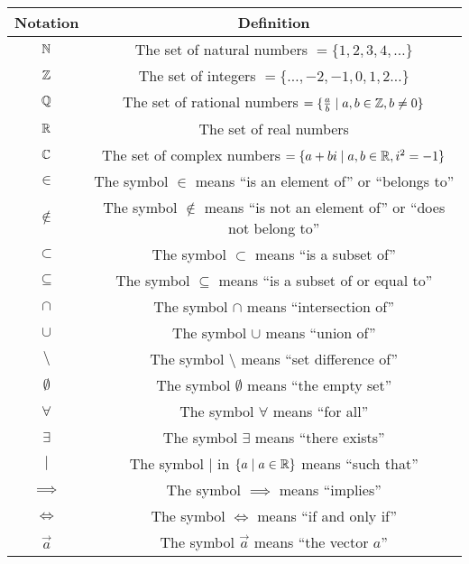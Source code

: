 \documentclass{report}
\begin{document}
\begin{table}[htpb]
	\centering
	\label{tab:notation}
	\begin{tabular}{|c|c|}
		\hline
		\textbf{Notation} & \textbf{Definition}                                                          \\
		\hline
		$\NN$             & The set of natural numbers $= \{1, 2, 3, 4, \ldots\}$                        \\
		$\ZZ$             & The set of integers $= \{\ldots, -2, -1, 0, 1, 2 \ldots\}$                   \\
		$\QQ$             & The set of rational numbers $= \{\frac{a}{b} \mid a, b \in \ZZ, b \neq 0 \}$ \\
		$\RR$             & The set of real numbers                                                      \\
		$\CC$             & The set of complex numbers $= \{a + bi \mid a, b \in \RR, i^2 = -1\}$        \\
		$\in$             & The symbol $\in$ means ``is an element of'' or ``belongs to''                \\
		$\notin$          & The symbol $\notin$ means ``is not an element of'' or ``does not belong to'' \\
		$\subset$         & The symbol $\subset$ means ``is a subset of''                                \\
		$\subseteq$       & The symbol $\subseteq$ means ``is a subset of or equal to''                  \\
		$\cap$            & The symbol $\cap$ means ``intersection of''                                  \\
		$\cup$            & The symbol $\cup$ means ``union of''                                         \\
		$\setminus$       & The symbol $\setminus$ means ``set difference of''                           \\
		$\emptyset$       & The symbol $\emptyset$ means ``the empty set''                               \\
		$\forall$         & The symbol $\forall$ means ``for all''                                       \\
		$\exists$         & The symbol $\exists$ means ``there exists''                                  \\
		$\mid$            & The symbol $\mid$ in $\{ a \mid a \in \RR\}$ means ``such that''             \\
		$\implies$        & The symbol $\implies$ means ``implies''                                      \\
		$\iff$            & The symbol $\iff$ means ``if and only if''                                   \\
		$\vec{a}$         & The symbol $\vec{a}$ means ``the vector $a$''                                \\
		\hline
	\end{tabular}
\end{table}
\end{document}
